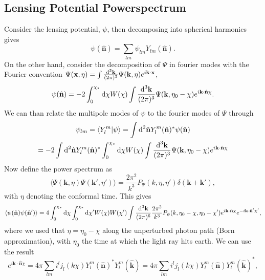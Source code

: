 \documentclass[11pt]{article} %
\DeclareRobustCommand{\d}{\ifmmode\text{d}\else d\fi}
\begin{document}
\subsection{Lensing Potential Powerspectrum}
Consider the lensing potential, $\psi$, then decomposing into spherical harmonics gives
\begin{equation}
    \psi(\hat{\mathbf n}) = \sum_{lm} \psi_{lm}Y_{lm}(\hat{\mathbf n}).
\end{equation}
On the other hand, consider the decomposition of $\Psi$ in fourier modes with the Fourier convention $\Psi(\mathbf x, \eta)=\int\frac{\d^3 \mathbf k}{(2\pi)^{3}}\Psi(\mathbf k, \eta)e^{i\mathbf k \cdot\mathbf x}$,
\begin{equation}
    \psi(\hat{\mathbf n}) = -2 \int_0^{\chi_*}\d \chi W(\chi) \int\frac{\d^3 \mathbf k}{(2\pi)^{3}}\Psi(\mathbf k, \eta_0 - \chi)e^{i\mathbf k \cdot\hat{\mathbf n}\chi}.
\end{equation}
We can than relate the multipole modes of $\psi$ to the fourier modes of $\Psi$ through %
\begin{gather}
    \psi_{lm} = \langle Y_l^m | \psi \rangle = \int\d^2\hat{\mathbf n} Y_l^m(\hat{\mathbf n})^* \psi(\hat{\mathbf n})\\ 
    = -2\int\d^2\hat{\mathbf n} Y_l^m(\hat{\mathbf n})^* \int_0^{\chi_*}\d \chi W(\chi) \int\frac{\d^3 \mathbf k}{(2\pi)^{3}}\Psi(\mathbf k, \eta_0 - \chi)e^{i\mathbf k \cdot\hat{\mathbf n}\chi}
\end{gather}
Now define the power spectrum as
\begin{equation}
    \langle \Psi(\mathbf k, \eta)\Psi(\mathbf k',\eta')\rangle = \frac{2\pi^2}{k^3}P_\Psi(k, \eta, \eta')\delta(\mathbf k + \mathbf k'),
\end{equation}
with $\eta$ denoting the conformal time. This gives 
\begin{equation}
    \langle \psi(\hat{\mathbf n})\psi(\hat{\mathbf n}') \rangle = 4\int_0^{\chi_*}\d \chi\int_0^{\chi_*}\d \chi' W(\chi)W(\chi')\int \frac{\d^3\mathbf k}{(2\pi)^6}\frac{2\pi^2}{k^3}P_\psi(k,\eta_0 - \chi, \eta_0-\chi')e^{i\mathbf k\cdot\hat {\mathbf n}\chi}e^{-i\mathbf k\cdot\hat {\mathbf n}'\chi'},
\end{equation}
where we used that $\eta = \eta_0 - \chi$ along the unperturbed photon path (Born approximation), with $\eta_0$ the time at which the light ray hits earth. 
We can use the result
\begin{equation}
    e^{i\mathbf k \cdot \hat {\mathbf n}\chi}=4\pi\sum_{lm}i^lj_l(k\chi )Y_l^m(\hat{\mathbf n})^*Y_l^m(\hat{\mathbf k}) = 4\pi\sum_{lm}i^lj_l(k\chi )Y_l^m(\hat{\mathbf n})Y_l^m(\hat{\mathbf k})^*,
\end{equation}
\end{document}
